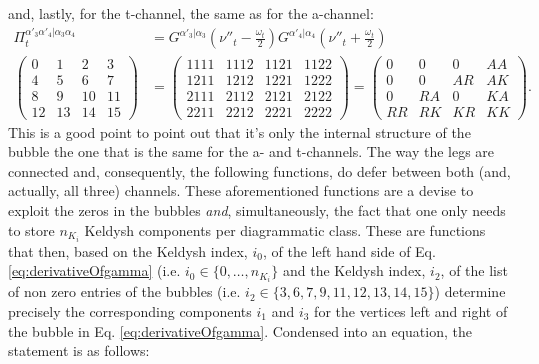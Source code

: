 \documentclass[12pt,a4paper,roman]{article}
\begin{document}
and, lastly, for the t-channel, the same as for the a-channel:
\begin{align}
\Pi_t^{\alpha'_3\alpha'_4|\alpha_3\alpha_4} &= G^{\alpha'_3|\alpha_3}\left(\nu''_t-\frac{\omega_t}{2}\right)G^{\alpha'_4|\alpha_4}\left(\nu''_t+\frac{\omega_t}{2}\right)\\
\begin{pmatrix}
0  & 1  & 2   & 3\\
4  & 5  & 6   & 7\\
8  & 9  & 10 & 11\\
12& 13&14 & 15
\end{pmatrix} &=
\begin{pmatrix}
1111 & 1112 & 1121 & 1122 \\
1211 & 1212 & 1221 & 1222\\
2111 & 2112 & 2121 & 2122\\
2211& 2212 & 2221 & 2222
\end{pmatrix} = \begin{pmatrix}
0    & 0    & 0    & AA \\
0    & 0    & AR & AK\\
0    & RA & 0    & KA\\
RR & RK & KR & KK
\end{pmatrix}.
\end{align}
This is a good point to point out that it's only the internal structure of the bubble the one that is the same for the a- and t-channels. The way the legs are connected and, consequently, the following functions, do defer between both (and, actually, all three) channels.
These aforementioned functions are a devise to exploit the zeros in the bubbles \textit{and}, simultaneously, the fact that one only needs to store $n_{K_i}$ Keldysh components per diagrammatic class. These are functions that then, based on the Keldysh index, $i_0$, of the left hand side of Eq. \ref{eq:derivativeOfgamma} (i.e. $i_0\in\{0,\dots, n_{K_i}\}$ and the Keldysh index, $i_2$, of the list of non zero entries of the bubbles (i.e. $i_2\in\{3, 6, 7, 9, 11, 12, 13, 14, 15\}$)  determine precisely the corresponding components $i_1$ and $i_3$ for the vertices left and right of the bubble in Eq. \ref{eq:derivativeOfgamma}. Condensed into an equation, the statement is as follows:
\end{document}
